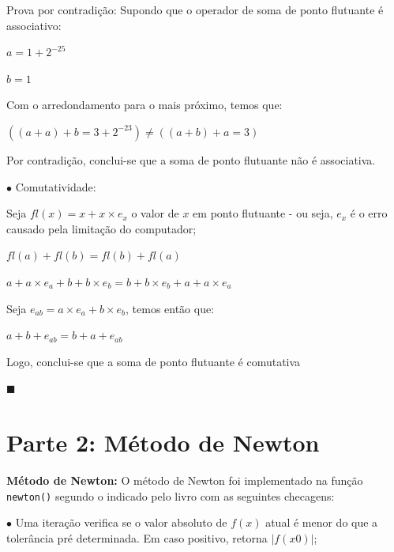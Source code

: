 \documentclass{article}
\begin{document}
\qquad\quad Prova por contradição: Supondo que o operador de soma de ponto flutuante é associativo:

\begin{center}
$a = 1 + 2^{-25}$

$b = 1$
\end{center}

\qquad\quad Com o arredondamento para o mais próximo, temos que:

\begin{center}
$((a + a) + b = 3 + 2^{-23}) \neq ((a + b) + a = 3)$
\end{center}

\qquad\quad Por contradição, conclui-se que a soma de ponto flutuante não é associativa.

\bigskip
\qquad$\bullet$ Comutatividade:

\qquad\quad Seja $fl(x) = x + x \times e_{x}$ o valor de $x$ em ponto flutuante - ou seja, $e_{x}$ é o erro causado pela limitação do computador;

\begin{center}
$fl(a) + fl(b) = fl(b) + fl(a)$

$a + a \times e_{a} + b + b \times e_{b} = b + b \times e_{b} + a + a \times e_{a}$
\end{center}

\qquad\quad Seja $e_{ab} = a \times e_{a} + b \times e_{b}$, temos então que:

\begin{center}
$a + b + e_{ab} = b + a + e_{ab}$
\end{center}

\qquad\quad Logo, conclui-se que a soma de ponto flutuante é comutativa

\begin{flushright}
$\blacksquare$
\end{flushright}

\section{Parte 2: Método de Newton}

\bigskip
\qquad\textbf{Método de Newton:} O método de Newton foi implementado na função \texttt{newton()} segundo o indicado pelo livro com as seguintes checagens:

\qquad\quad$\bullet$ Uma iteração verifica se o valor absoluto de $f(x)$ atual é menor do que a tolerância pré determinada. Em caso positivo, retorna $|f(x0)|$;
\end{document}
